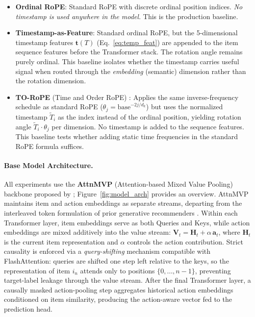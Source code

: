 \documentclass{article}
\begin{document}
\begin{itemize}
  \item \textbf{Ordinal RoPE}: Standard RoPE with discrete ordinal position
    indices. \emph{No timestamp is used anywhere in the model.}
    This is the production baseline.
  \item \textbf{Timestamp-as-Feature}: Standard ordinal RoPE, but the
    5-dimensional timestamp features $\mathbf{t}(T)$
    (Eq.~\eqref{eq:temp_feat}) are appended to the item sequence features
    before the Transformer stack. The rotation angle remains purely ordinal.
    This baseline isolates whether the timestamp carries useful signal when
    routed through the \emph{embedding} (semantic) dimension rather than the
    rotation dimension.
  \item \textbf{TO-RoPE} (Time and Order RoPE) \citep{shirkavand2025torope}:
    Applies the same inverse-frequency schedule as standard RoPE
    ($\theta_j = \mathrm{base}^{-2j/d_k}$) but uses the normalized timestamp
    $\tilde{T}_i$ as the index instead of the ordinal position, yielding
    rotation angle $\tilde{T}_i \cdot \theta_j$ per dimension. No timestamp is
    added to the sequence features. This baseline tests whether adding static
    time frequencies in the standard RoPE formula suffices.
\end{itemize}

\paragraph{Base Model Architecture.}
All experiments use the \textbf{AttnMVP} (Attention-based Mixed Value Pooling) backbone
proposed by \citet{cheng2026}; Figure~\ref{fig:model_arch} provides an overview.
AttnMVP maintains item and action embeddings as separate streams, departing from the
interleaved token formulation of prior generative recommenders \citep{zhai2024actions}.
Within each Transformer layer, item embeddings serve as both Queries and Keys, while action
embeddings are mixed additively into the value stream:
$\mathbf{V}_t = \mathbf{H}_t + \alpha\,\mathbf{a}_t$, where $\mathbf{H}_t$ is the current
item representation and $\alpha$ controls the action contribution. Strict causality is
enforced via a \emph{query-shifting} mechanism compatible with FlashAttention: queries are
shifted one step left relative to the keys, so the representation of item $i_n$ attends
only to positions $\{0,\ldots,n-1\}$, preventing target-label leakage through the value
stream. After the final Transformer layer, a causally masked action-pooling step aggregates
historical action embeddings conditioned on item similarity, producing the action-aware
vector fed to the prediction head.
\end{document}
